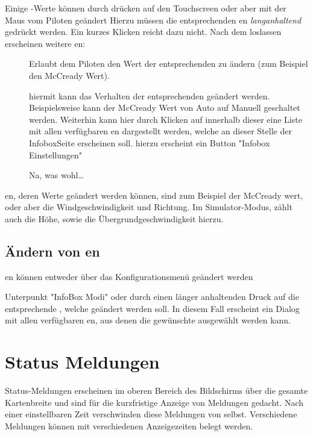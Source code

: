 Einige {\InfoBox}-Werte können durch drücken auf den Touchscreen oder aber mit der Maus vom Piloten geändert
Hierzu müssen die entsprechenden {\InfoBox}en  \emph{langanhaltend} gedrückt werden.
Ein kurzes Klicken reicht dazu nicht.  Nach dem loslassen erscheinen weitere {\InfoBox}en:

\begin{description}
\item[]
Erlaubt dem Piloten den Wert der entsprechenden {\InfoBox} zu ändern (zum Beispiel den McCready Wert).

\item[]
hiermit kann das Verhalten der entsprechenden {\InfoBox} geändert werden. Beispielsweise kann der McCready Wert von Auto auf Manuell geschaltet werden.
Weiterhin kann hier durch Klicken auf   innerhalb dieser {\InfoBox}  eine Liste mit allen verfügbaren {\InfoBox}en dargestellt werden, welche an dieser Stelle der InfoboxSeite erscheinen soll. hierzu erscheint ein Button "Infobox Einstellungen"

\item[] Na, was wohl\dots
\end{description}

{\InfoBox}en, deren Werte geändert werden können, sind zum Beispiel der McCready wert, oder aber die Windgeschwindigkeit und Richtung. Im Simulator-Modus, zählt auch die Höhe, sowie die Übergrundgeschwindigkeit hierzu.

\subsection*{Ändern von {\InfoBox}en}
{\InfoBox}en können entweder über das Konfigurationsmenü geändert werden
\begin{quote}
\blink{}\blink{}\blink{}
\end{quote}  Unterpunkt "InfoBox Modi"
oder durch einen länger anhaltenden Druck auf die entsprechende  {\InfoBox}, welche geändert werden soll.
 In diesem Fall erscheint ein Dialog mit allen verfügbaren {\InfoBox}en, aus denen die gewünschte ausgewählt werden kann.

\section{Status Meldungen}
Status-Meldungen erscheinen im oberen Bereich des Bildschirms über die gesamte Kartenbreite und sind für die kurzfristige Anzeige von Meldungen gedacht. Nach einer einstellbaren Zeit verschwinden diese Meldungen von selbst. Verschiedene Meldungen können mit verschiedenen Anzeigezeiten belegt werden.

